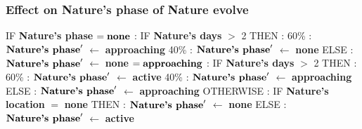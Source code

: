 \documentclass{article}%
\begin{document}
\subsubsection{Effect on Nature's phase of Nature evolve}%
\label{ssubsec:Effect on Nature's phase of Nature evolve}%
\begin{flushleft}%
IF %
\textbf{Nature's phase}%
\linebreak%
\hspace*{2em}%
$= \mbox{\textbf{none}}$%
: %
IF %
\textbf{Nature's days}%
$>$%
2%
\linebreak%
\hspace*{4em}%
THEN %
: %
\linebreak%
\hspace*{6em}%
60\%%
: %
$\mbox{\textbf{Nature's phase}} '$%
$\leftarrow$%
\textbf{approaching}%
\linebreak%
\hspace*{6em}%
40\%%
: %
$\mbox{\textbf{Nature's phase}} '$%
$\leftarrow$%
\textbf{none}%
\linebreak%
\hspace*{4em}%
ELSE %
: %
$\mbox{\textbf{Nature's phase}} '$%
$\leftarrow$%
\textbf{none}%
\linebreak%
\hspace*{2em}%
$= \mbox{\textbf{approaching}}$%
: %
IF %
\textbf{Nature's days}%
$>$%
2%
\linebreak%
\hspace*{4em}%
THEN %
: %
\linebreak%
\hspace*{6em}%
60\%%
: %
$\mbox{\textbf{Nature's phase}} '$%
$\leftarrow$%
\textbf{active}%
\linebreak%
\hspace*{6em}%
40\%%
: %
$\mbox{\textbf{Nature's phase}} '$%
$\leftarrow$%
\textbf{approaching}%
\linebreak%
\hspace*{4em}%
ELSE %
: %
$\mbox{\textbf{Nature's phase}} '$%
$\leftarrow$%
\textbf{approaching}%
\linebreak%
\hspace*{2em}%
OTHERWISE %
: %
IF %
\textbf{Nature's location}%
$=$%
\textbf{none}%
\linebreak%
\hspace*{4em}%
THEN %
: %
$\mbox{\textbf{Nature's phase}} '$%
$\leftarrow$%
\textbf{none}%
\linebreak%
\hspace*{4em}%
ELSE %
: %
$\mbox{\textbf{Nature's phase}} '$%
$\leftarrow$%
\textbf{active}%
\end{flushleft}
\end{document}
